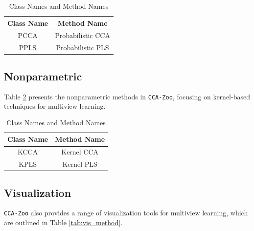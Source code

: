 \begin{table}[ht]
    \centering
    \begin{tabular}{|c|c|}
        \hline
        Class Name & Method Name \\
        \hline
        PCCA & Probabilistic CCA \\
        PPLS & Probabilistic PLS \\
        \hline
    \end{tabular}
    \caption{Class Names and Method Names}\label{tab:class_method_3}
\end{table}

\subsection{Nonparametric}
Table \ref{tab:class_method_4} presents the nonparametric methods in \texttt{CCA-Zoo}, focusing on kernel-based techniques for multiview learning.


\begin{table}[ht]
    \centering
    \begin{tabular}{|c|c|}
        \hline
        Class Name & Method Name \\
        \hline
        KCCA & Kernel CCA \\
        KPLS & Kernel PLS \\
        \hline
    \end{tabular}
    \caption{Class Names and Method Names}\label{tab:class_method_4}
\end{table}

\subsection{Visualization}
\texttt{CCA-Zoo} also provides a range of visualization tools for multiview learning, which are outlined in Table \ref{tab:vis_method}.

